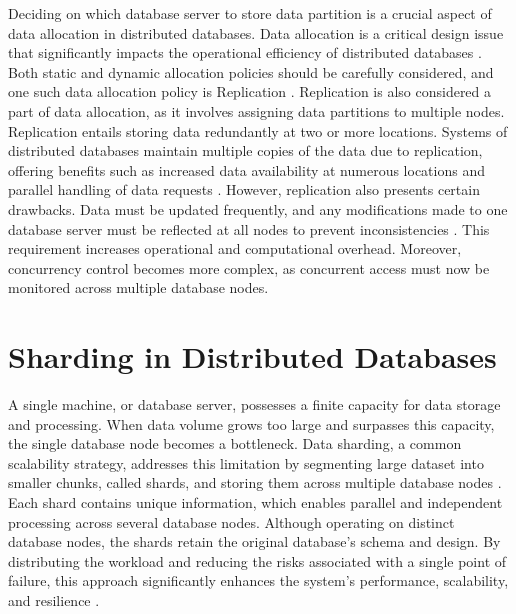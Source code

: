 Deciding on which database server to store data partition is a crucial aspect of data allocation in distributed databases. Data allocation is a critical design issue that significantly impacts the operational efficiency of distributed databases \cite{apers1988data}. Both static and dynamic allocation policies should be carefully considered, and one such data allocation policy is Replication \cite{huang2001fragment, chandra2012dynamic}. 
Replication is also considered a part of data allocation, as it involves assigning data partitions to multiple nodes. Replication entails storing data redundantly at two or more locations. Systems of distributed databases maintain multiple copies of the data due to replication, offering benefits such as increased data availability at numerous locations and parallel handling of data requests \cite{mazilu2010database}.
However, replication also presents certain drawbacks. Data must be updated frequently, and any modifications made to one database server must be reflected at all nodes to prevent inconsistencies \cite{daudpota1998five}. This requirement increases operational and computational overhead. Moreover, concurrency control becomes more complex, as concurrent access must now be monitored across multiple database nodes.

\section{Sharding in Distributed Databases}
\label{shardingDD}
A single machine, or database server, possesses a finite capacity for data storage and processing. When data volume grows too large and surpasses this capacity, the single database node becomes a bottleneck. Data sharding, a common scalability strategy, addresses this limitation by segmenting large dataset into smaller chunks, called shards, and storing them across multiple database nodes \cite{9411547, 9357711, 10.1145/2491245}. Each shard contains unique information, which enables parallel and independent processing across several database nodes. Although operating on distinct database nodes, the shards retain the original database's schema and design. By distributing the workload and reducing the risks associated with a single point of failure, this approach significantly enhances the system's performance, scalability, and resilience \cite{abdelhafiz2020distributed}. \\

